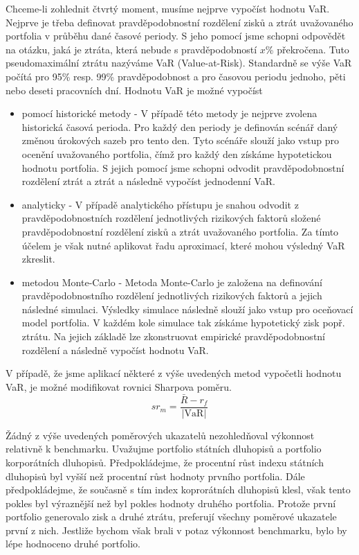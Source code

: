 \documentclass[a4paper]{book}
\begin{document}
Chceme-li zohlednit čtvrtý moment, musíme nejprve vypočíst hodnotu VaR. Nejprve je třeba definovat pravděpodobnostní rozdělení zisků a ztrát uvažovaného portfolia v průběhu dané časové periody. S jeho pomocí jsme schopni odpovědět na otázku, jaká je ztráta, která nebude s pravděpodobností $x$\% překročena. Tuto pseudomaximální ztrátu nazýváme VaR (Value-at-Risk). Standardně se výše VaR počítá pro 95\% resp. 99\% pravděpodobnost a pro časovou periodu jednoho, pěti nebo deseti pracovních dní. Hodnotu VaR je možné vypočíst
\begin{itemize}
\item pomocí historické metody - V případě této metody je nejprve zvolena historická časová perioda. Pro každý den periody je definován scénář daný změnou úrokových sazeb pro tento den. Tyto scénáře slouží jako vstup pro ocenění uvažovaného portfolia, čímž pro každý den získáme hypotetickou hodnotu portfolia. S jejich pomocí jsme schopni odvodit pravděpodobnostní rozdělení ztrát a ztrát a následně vypočíst jednodenní VaR.
\item analyticky - V případě analytického přístupu je snahou odvodit z pravděpodobnostních rozdělení jednotlivých rizikových faktorů složené pravděpodobnostní rozdělení zisků a ztrát uvažovaného portfolia. Za tímto účelem je však nutné aplikovat řadu aproximací, které mohou výsledný VaR zkreslit.
\item metodou Monte-Carlo - Metoda Monte-Carlo je založena na definování pravděpodobnostního rozdělení jednotlivých rizikových faktorů a jejich následné simulaci. Výsledky simulace následně slouží jako vstup pro oceňovací model portfolia. V každém kole simulace tak získáme hypotetický zisk popř. ztrátu. Na jejich základě lze zkonstruovat empirické pravděpodobnostní rozdělení a následně vypočíst hodnotu VaR.
\end{itemize}
V případě, že jsme aplikací některé z výše uvedených metod vypočetli hodnotu VaR, je možné modifikovat rovnici Sharpova poměru.
\begin{equation*}
sr_m = \frac{\bar{R}-r_f}{|\mathrm{VaR}|}
\end{equation*}

Žádný z výše uvedených poměrových ukazatelů nezohledňoval výkonnost relativně k benchmarku. Uvažujme portfolio státních dluhopisů a portfolio korporátních dluhopisů. Předpokládejme, že procentní růst indexu státních dluhopisů byl vyšší než procentní růst hodnoty prvního portfolia. Dále předpokládejme, že současně s tím index koprorátních dluhopisů klesl, však tento pokles byl výraznější než byl pokles hodnoty druhého portfolia. Protože první portfolio generovalo zisk a druhé ztrátu, preferují všechny poměrové ukazatele první z nich. Jestliže bychom však brali v potaz výkonnost benchmarku, bylo by lépe hodnoceno druhé portfolio.
\end{document}
